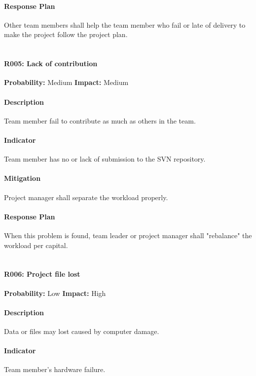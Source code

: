 \documentclass[11pt, a4paper]{report}
\begin{document}
	\paragraph{Response Plan}Other team members shall help the team member who fail or late of delivery to make the project follow the project plan. \\\\

\pagebreak

	\paragraph{R005: Lack of contribution} \hspace{1cm} \textbf{Probability: }Medium\hspace{1cm}   \textbf{Impact: }Medium
	\paragraph{Description}Team member fail to contribute as much as others in the team.
	\paragraph{Indicator}Team member has no or lack of submission to the SVN repository. 
	\paragraph{Mitigation}Project manager shall separate the workload properly.
	\paragraph{Response Plan}When this problem is found, team leader or project manager shall "rebalance" the workload per capital. \\\\

	\paragraph{R006: Project file lost} \hspace{1cm} \textbf{Probability: }Low\hspace{1cm}   \textbf{Impact: }High
	\paragraph{Description}Data or files may lost caused by computer damage.
	\paragraph{Indicator}Team member's hardware failure. 
\end{document}
